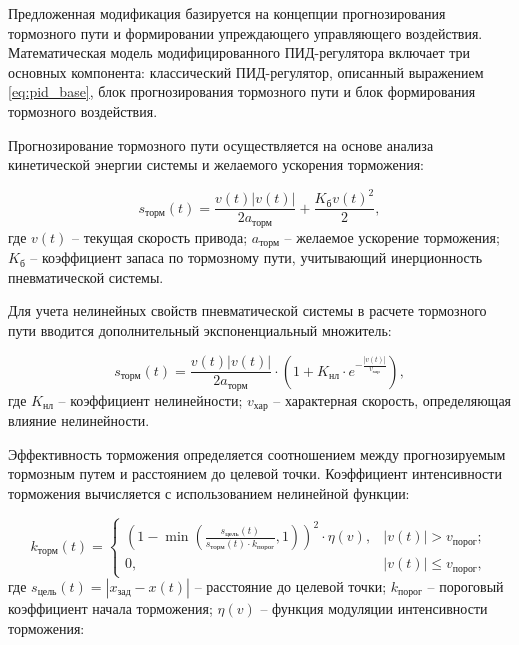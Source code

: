 Предложенная модификация базируется на концепции прогнозирования тормозного пути и формировании упреждающего
управляющего воздействия. Математическая модель модифицированного ПИД-регулятора включает три основных компонента:
классический ПИД-регулятор, описанный выражением \eqref{eq:pid_base}, блок прогнозирования тормозного пути и блок формирования тормозного воздействия.

Прогнозирование тормозного пути осуществляется на основе анализа кинетической энергии системы и желаемого ускорения торможения:

\begin{equation}\label{eq:braking_prediction}
	s_{\text{торм}}(t) = \frac{v(t)|v(t)|}{2a_{\text{торм}}} + \frac{K_{\text{б}}v(t)^2}{2},
\end{equation}
где $v(t)$ -- текущая скорость привода;
$a_{\text{торм}}$ -- желаемое ускорение торможения;
$K_{\text{б}}$ -- коэффициент запаса по тормозному пути, учитывающий инерционность пневматической системы.


Для учета нелинейных свойств пневматической системы в расчете тормозного пути вводится дополнительный экспоненциальный множитель:

\begin{equation}\label{eq:modified_braking_distance}
	s_{\text{торм}}(t) = \frac{v(t)|v(t)|}{2a_{\text{торм}}} \cdot \left(1 + K_\text{нл} \cdot e^{-\frac{|v(t)|}{v_\text{хар}}}\right),
\end{equation}
где $K_\text{нл}$ -- коэффициент нелинейности;
$v_\text{хар}$ -- характерная скорость, определяющая влияние нелинейности.

Эффективность торможения определяется соотношением между прогнозируемым
тормозным путем и расстоянием до целевой точки. Коэффициент интенсивности торможения вычисляется с использованием нелинейной функции:

\begin{equation}\label{eq:braking_intensity_expanded}
	k_{\text{торм}}(t) = \begin{cases}
		\left(1 - \min\left(\frac{s_{\text{цель}}(t)}{s_{\text{торм}}(t) \cdot k_{\text{порог}}}, 1\right)\right)^2 \cdot \eta(v), & |v(t)| > v_{\text{порог}};   \\
		0,                                                                                                                         & |v(t)| \leq v_{\text{порог}},
	\end{cases}
\end{equation}
где $s_{\text{цель}}(t) = |x_{\text{зад}} - x(t)|$ -- расстояние до целевой точки;
$k_{\text{порог}}$ -- пороговый коэффициент начала торможения;
$\eta(v)$ -- функция модуляции интенсивности торможения:

